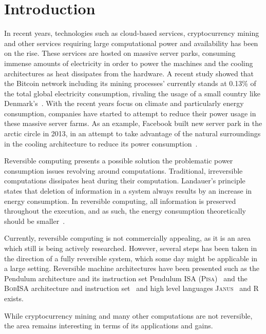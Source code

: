 \chapter{Introduction}
\label{chp:introduction}
In recent years, technologies such as cloud-based services, cryptocurrency mining and other services requiring large computational power and availability has been on the rise. These services are hosted on massive server parks, consuming immense amounts of electricity in order to power the machines and the cooling architectures as heat dissipates from the hardware. A recent study showed that the Bitcoin network including its mining processes' currently stands at 0.13\% of the total global electricity consumption, rivaling the usage of a small country like Denmark's~\cite{digiconomist:bitcoin}. With the recent years focus on climate and particularly energy consumption, companies have started to attempt to reduce their power usage in these massive server farms. As an example, Facebook built new server park in the arctic circle in 2013, in an attempt to take advantage of the natural surroundings in the cooling architecture to reduce its power consumption~\cite{bloomberg:facebook}. 

Reversible computing presents a possible solution the problematic power consumption issues revolving around computations. Traditional, irreversible computations dissipates heat during their computation. Landauer's principle states that deletion of information in a system always results by an increase in energy consumption. In reversible computing, all information is preserved throughout the execution, and as such, the energy consumption theoretically should be smaller~\cite{rl:irreversibility}.

Currently, reversible computing is not commercially appealing, as it is an area which still is being actively researched. However, several steps has been taken in the direction of a fully reversible system, which some day might be applicable in a large setting. Reversible machine architectures have been presented such as the Pendulum architecture and its instruction set Pendulum ISA (\textsc{Pisa})~\cite{cv:pendulum} and the \textsc{BobISA} architecture and instruction set~\cite{mt:bob} and high level languages \textsc{Janus}~\cite{cl:janus, ty:janus, ty:ejanus} and \textsc{R}~\cite{mf:r} exists. 

While cryptocurrency mining and many other computations are not reversible, the area remains interesting in terms of its applications and gains.


